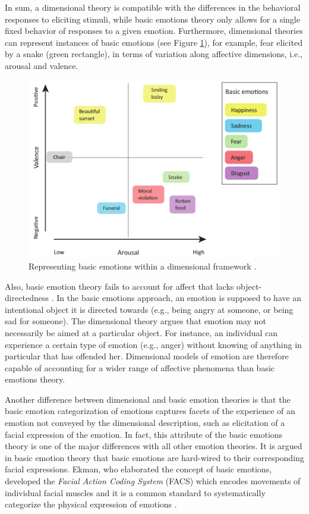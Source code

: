 \documentclass[12pt]{report}
\begin{document}
In sum, a dimensional theory is compatible with the differences in the
behavioral responses to eliciting stimuli, while basic emotions theory only
allows for a single fixed behavior of responses to a given emotion. Furthermore,
dimensional theories can represent instances of basic emotions (see Figure
\ref{fig:dimensional-discrete}), for example, fear elicited by a snake (green
rectangle), in terms of variation along affective dimensions, i.e., arousal and
valence.

\begin{figure}[tbh]
  \center
  \includegraphics[width=.9\textwidth]{figure/dimensional-discrete.png}
  \caption{Representing basic emotions within a dimensional framework
  \cite{hamann:mapping-discrete-dimensional}.}
  \label{fig:dimensional-discrete}
\end{figure}

Also, basic emotion theory fails to account for affect that lacks
object-directedness \cite{russell:core-affect}. In the basic emotions approach,
an emotion is supposed to have an intentional object it is directed towards (e.g.,
being angry at someone, or being sad for someone). The dimensional theory argues
that emotion may not necessarily be aimed at a particular object. For instance,
an individual can experience a certain type of emotion (e.g., anger) without
knowing of anything in particular that has offended her. Dimensional models of
emotion are therefore capable of accounting for a wider range of affective
phenomena than basic emotions theory.

Another difference between dimensional and basic emotion theories is that the
basic emotion categorization of emotions captures facets of the experience of
an emotion not conveyed by the dimensional description, such as elicitation of a
facial expression of the emotion. In fact, this attribute of the basic
emotions theory is one of the major differences with all other emotion theories.
It is argued in basic emotion theory that basic emotions are hard-wired to their
corresponding facial expressions. Ekman, who elaborated the concept of basic
emotions, developed the \textit{Facial Action Coding System} (FACS) which
encodes movements of individual facial muscles and it is a common standard to
systematically categorize the physical expression of emotions
\cite{ekman:facial-movement}.
\end{document}
